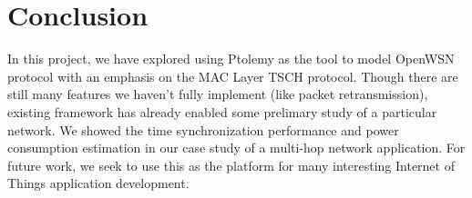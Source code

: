 
\section{Conclusion}
\label{sec:conclusion}

In this project, we have explored using Ptolemy as the tool to model OpenWSN protocol with an emphasis on the MAC Layer TSCH protocol. Though there are still many features we haven't fully implement (like packet retransmission), existing framework has already enabled some prelimary study of a particular network. We showed the time synchronization performance and power consumption estimation in our case study of a multi-hop network application. For future work, we seek to use this as the platform for many interesting Internet of Things application development. 

